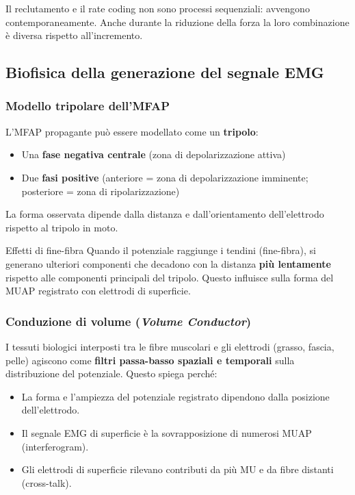 \begin{attenzione}[]
Il reclutamento e il rate coding non sono processi sequenziali: avvengono contemporaneamente. Anche durante la riduzione della forza la loro combinazione è diversa rispetto all'incremento.
\end{attenzione}

\subsection{Biofisica della generazione del segnale EMG}

\subsubsection{Modello tripolare dell'MFAP}

L'MFAP propagante può essere modellato come un \textbf{tripolo}:
\begin{itemize}
    \item Una \textbf{fase negativa centrale} (zona di depolarizzazione attiva)
    \item Due \textbf{fasi positive} (anteriore = zona di depolarizzazione imminente; posteriore = zona di ripolarizzazione)
\end{itemize}
La forma osservata dipende dalla distanza e dall'orientamento dell'elettrodo rispetto al tripolo in moto.

\begin{approfondimento}{Effetti di fine-fibra}
Quando il potenziale raggiunge i tendini (fine-fibra), si generano ulteriori componenti che decadono con la distanza \textbf{più lentamente} rispetto alle componenti principali del tripolo. Questo influisce sulla forma del MUAP registrato con elettrodi di superficie.
\end{approfondimento}

\subsubsection{Conduzione di volume (\textit{Volume Conductor})}

I tessuti biologici interposti tra le fibre muscolari e gli elettrodi (grasso, fascia, pelle) agiscono come \textbf{filtri passa-basso spaziali e temporali} sulla distribuzione del potenziale. Questo spiega perché:
\begin{itemize}
    \item La forma e l'ampiezza del potenziale registrato dipendono dalla posizione dell'elettrodo.
    \item Il segnale EMG di superficie è la sovrapposizione di numerosi MUAP (interferogram).
    \item Gli elettrodi di superficie rilevano contributi da più MU e da fibre distanti (cross-talk).
\end{itemize}

